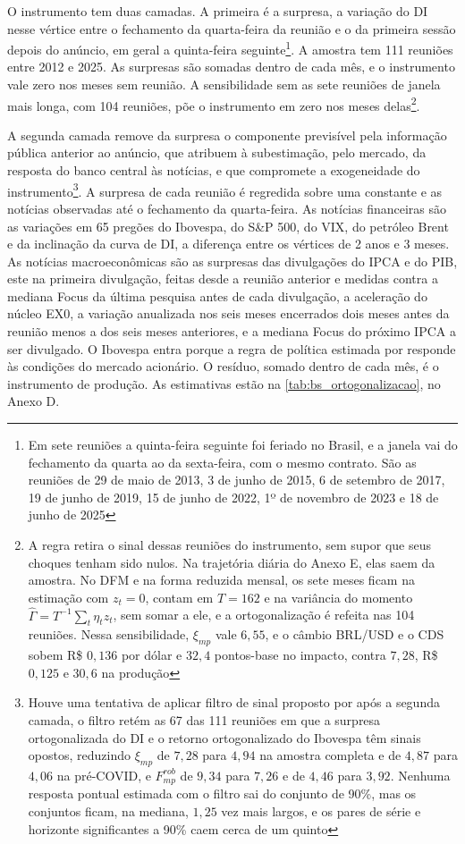 \documentclass[preprint,authoryear,review,12pt]{elsarticle}
\begin{document}
O instrumento tem duas camadas. A primeira é a surpresa, a variação do DI nesse vértice entre o fechamento da quarta-feira da reunião e o da primeira sessão depois do anúncio, em geral a quinta-feira seguinte\footnote{Em sete reuniões a quinta-feira seguinte foi feriado no Brasil, e a janela vai do fechamento da quarta ao da sexta-feira, com o mesmo contrato. São as reuniões de 29 de maio de 2013, 3 de junho de 2015, 6 de setembro de 2017, 19 de junho de 2019, 15 de junho de 2022, 1º de novembro de 2023 e 18 de junho de 2025}. A amostra tem 111 reuniões entre 2012 e 2025. As surpresas são somadas dentro de cada mês, e o instrumento vale zero nos meses sem reunião. A sensibilidade sem as sete reuniões de janela mais longa, com 104 reuniões, põe o instrumento em zero nos meses delas\footnote{A regra retira o sinal dessas reuniões do instrumento, sem supor que seus choques tenham sido nulos. Na trajetória diária do Anexo E, elas saem da amostra. No DFM e na forma reduzida mensal, os sete meses ficam na estimação com $z_t = 0$, contam em $T = 162$ e na variância do momento $\hat{\Gamma} = T^{-1}\sum_t \eta_t z_t$, sem somar a ele, e a ortogonalização é refeita nas 104 reuniões. Nessa sensibilidade, $\xi_{mp}$ vale $6{,}55$, e o câmbio BRL/USD e o CDS sobem R\$ $0{,}136$ por dólar e $32{,}4$ pontos-base no impacto, contra $7{,}28$, R\$ $0{,}125$ e $30{,}6$ na produção}.

A segunda camada remove da surpresa o componente previsível pela informação pública anterior ao anúncio, que \cite{bauer2023} atribuem à subestimação, pelo mercado, da resposta do banco central às notícias, e que compromete a exogeneidade do instrumento\footnote{Houve uma tentativa de aplicar filtro de sinal proposto por \cite{jarocinski2020} após a segunda camada, o filtro retém as 67 das 111 reuniões em que a surpresa ortogonalizada do DI e o retorno ortogonalizado do Ibovespa têm sinais opostos, reduzindo $\xi_{mp}$ de $7{,}28$ para $4{,}94$ na amostra completa e de $4{,}87$ para $4{,}06$ na pré-COVID, e $F^{rob}_{mp}$ de $9{,}34$ para $7{,}26$ e de $4{,}46$ para $3{,}92$. Nenhuma resposta pontual estimada com o filtro sai do conjunto de 90\%, mas os conjuntos ficam, na mediana, $1{,}25$ vez mais largos, e os pares de série e horizonte significantes a 90\% caem cerca de um quinto}. A surpresa de cada reunião é regredida sobre uma constante e as notícias observadas até o fechamento da quarta-feira. As notícias financeiras são as variações em 65 pregões do Ibovespa, do S\&P 500, do VIX, do petróleo Brent e da inclinação da curva de DI, a diferença entre os vértices de 2 anos e 3 meses. As notícias macroeconômicas são as surpresas das divulgações do IPCA e do PIB, este na primeira divulgação, feitas desde a reunião anterior e medidas contra a mediana Focus da última pesquisa antes de cada divulgação, a aceleração do núcleo EX0, a variação anualizada nos seis meses encerrados dois meses antes da reunião menos a dos seis meses anteriores, e a mediana Focus do próximo IPCA a ser divulgado. O Ibovespa entra porque a regra de política estimada por \cite{castelnuovo} responde às condições do mercado acionário. O resíduo, somado dentro de cada mês, é o instrumento de produção. As estimativas estão na \autoref{tab:bs_ortogonalizacao}, no Anexo D.
\end{document}
